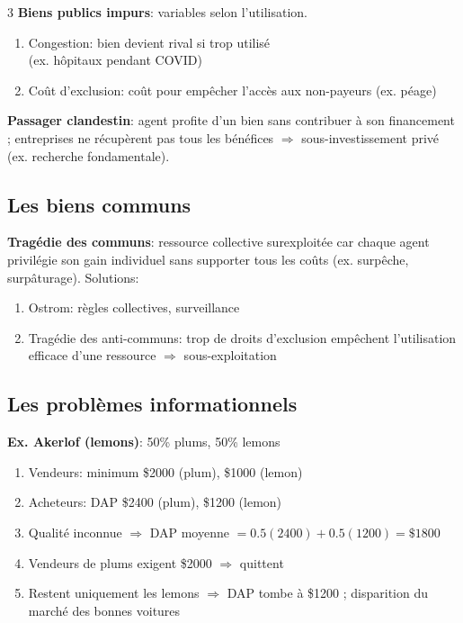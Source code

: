 \documentclass[12pt, a4paper]{article}
\begin{document}
\begin{multicols*}{3}
\textbf{Biens publics impurs}: variables selon l'utilisation.
\begin{enumerate}[\roman*.]
  \item Congestion: bien devient rival si trop utilisé\\(ex. hôpitaux pendant COVID)
  \item Coût d'exclusion: coût pour empêcher l'accès aux non-payeurs (ex. péage)
\end{enumerate}

\textbf{Passager clandestin}: agent profite d'un bien sans contribuer à son financement ; entreprises ne récupèrent pas tous les bénéfices $\Rightarrow$ sous-investissement privé\\(ex. recherche fondamentale).

\subsection{Les biens communs}

\textbf{Tragédie des communs}: ressource collective surexploitée car chaque agent privilégie son gain individuel sans supporter tous les coûts (ex. surpêche, surpâturage). Solutions:
\begin{enumerate}[\roman*.]
  \item Ostrom: règles collectives, surveillance
  \item Tragédie des anti-communs: trop de droits d'exclusion empêchent l'utilisation efficace d'une ressource $\Rightarrow$ sous-exploitation 
\end{enumerate}

\subsection{Les problèmes informationnels}

\textbf{Ex. Akerlof (lemons)}: 50\% plums, 50\% lemons
\begin{enumerate}[\roman*.]
  \item Vendeurs: minimum \$2000 (plum), \$1000 (lemon)
  \item Acheteurs: DAP \$2400 (plum), \$1200 (lemon)
  \item Qualité inconnue $\Rightarrow$ DAP moyenne $=0.5(2400)+0.5(1200)=\$1800$
  \item Vendeurs de plums exigent \$2000 $\Rightarrow$ quittent
  \item Restent uniquement les lemons $\Rightarrow$ DAP tombe à \$1200 ; disparition du marché des bonnes voitures
\end{enumerate}
\vspace{-1em}
\colbreak

\end{multicols*}
\end{document}

